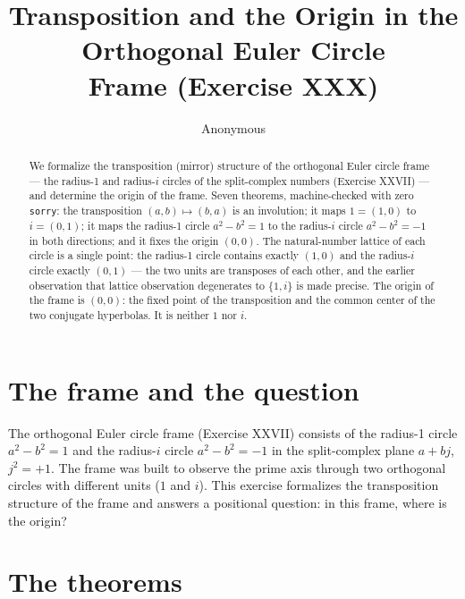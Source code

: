 \documentclass[sigplan,10pt,anonymous,review]{acmart}
\begin{document}
\title{Transposition and the Origin in the Orthogonal Euler Circle\\
Frame (Exercise XXX)}

\author{Anonymous}

\begin{abstract}
We formalize the transposition (mirror) structure of the orthogonal
Euler circle frame --- the radius-1 and radius-$i$ circles of the
split-complex numbers (Exercise XXVII) --- and determine the origin of
the frame. Seven theorems, machine-checked with zero \texttt{sorry}:
the transposition $(a,b) \mapsto (b,a)$ is an involution; it maps $1 =
(1,0)$ to $i = (0,1)$; it maps the radius-1 circle $a^2 - b^2 = 1$ to
the radius-$i$ circle $a^2 - b^2 = -1$ in both directions; and it fixes
the origin $(0,0)$. The natural-number lattice of each circle is a
single point: the radius-1 circle contains exactly $(1,0)$ and the
radius-$i$ circle exactly $(0,1)$ --- the two units are transposes of
each other, and the earlier observation that lattice observation
degenerates to $\{1, i\}$ is made precise. The origin of the frame is
$(0,0)$: the fixed point of the transposition and the common center of
the two conjugate hyperbolas. It is neither $1$ nor $i$.
\end{abstract}


\maketitle

\section{The frame and the question}

The orthogonal Euler circle frame (Exercise XXVII) consists of the
radius-1 circle $a^2 - b^2 = 1$ and the radius-$i$ circle
$a^2 - b^2 = -1$ in the split-complex plane $a + bj$, $j^2 = +1$. The
frame was built to observe the prime axis through two orthogonal
circles with different units ($1$ and $i$). This exercise formalizes the
transposition structure of the frame and answers a positional question:
in this frame, where is the origin?

\section{The theorems}
\end{document}
